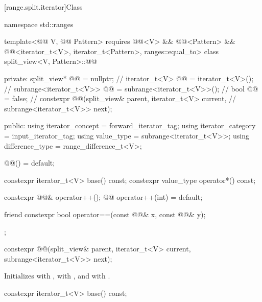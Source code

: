 [range.split.iterator]{Class }

%
\begin{codeblock}
namespace std::ranges {
  template<@@ V, @@ Pattern>
    requires @@<V> && @@<Pattern> &&
             @@<iterator_t<V>, iterator_t<Pattern>, ranges::equal_to>
  class split_view<V, Pattern>::@@ {
  private:
    split_view* @@ = nullptr;                                      // \expos
    iterator_t<V> @@ = iterator_t<V>();                               // \expos
    subrange<iterator_t<V>> @@ = subrange<iterator_t<V>>();          // \expos
    bool @@ = false;                                       // \expos
    constexpr @@(split_view& parent, iterator_t<V> current,       // \expos
                       subrange<iterator_t<V>> next);

  public:
    using iterator_concept = forward_iterator_tag;
    using iterator_category = input_iterator_tag;
    using value_type = subrange<iterator_t<V>>;
    using difference_type = range_difference_t<V>;

    @@() = default;

    constexpr iterator_t<V> base() const;
    constexpr value_type operator*() const;

    constexpr @@& operator++();
    @@ operator++(int) = default;

    friend constexpr bool operator==(const @@& x, const @@& y);
  };
}
\end{codeblock}

%
\begin{itemdecl}
constexpr @@(split_view& parent, iterator_t<V> current, subrange<iterator_t<V>> next);
\end{itemdecl}

\begin{itemdescr}
\pnum
\effects
Initializes  with ,
 with , and
 with .
\end{itemdescr}

%
\begin{itemdecl}
constexpr iterator_t<V> base() const;
\end{itemdecl}

